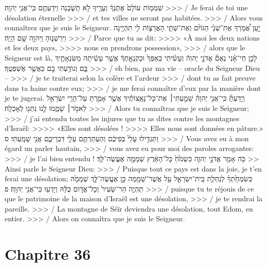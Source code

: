 \begin{paracol}[1]
  {שִֽׁמְמ֤וֹת עוֹלָם֙ אֶתֶּנְךָ֔
    וְעָרֶ֖יךָ לֹ֣א תָשֹׁ֑בְנָה
    וִֽידַעְתֶּ֖ם כִּֽי־אֲנִ֥י יְהוָֽה׃}
  {>>> / Je ferai de toi une désolation éternelle
    >>> / et tes villes ne seront pas habitées.
    >>> / Alors vous connaîtrez que je suis le Seigneur.}
  \verseSpace
  \verset
  {יַ֣עַן אֲ֠מָרְךָ
    אֶת־שְׁנֵ֙י הַגּוֹיִ֜ם וְאֶת־שְׁתֵּ֧י הָאֲרָצ֛וֹת לִ֥י תִהְיֶ֖ינָה
    וִֽירַשְׁנ֑וּהָ
    וַֽיהוָ֖ה שָׁ֥ם הָיָֽה׃}
  {>>> / Parce que tu as dit:
    >>>> «À moi les deux nations et les deux pays,
    >>>> nous en prendrons possession»,
    >>> / alors que le Seigneur est là,}
  \verset
  {לָכֵ֣ן חַי־אָ֗נִי נְאֻם֘ אֲדֹנָ֣י יְהוִה֒
    וְעָשִׂ֗יתִי כְּאַפְּךָ֙ וּכְקִנְאָ֣תְךָ֔
    אֲשֶׁ֣ר עָשִׂ֔יתָה מִשִּׂנְאָתֶ֖יךָ בָּ֑ם
    וְנוֹדַ֥עְתִּי בָ֖ם כַּאֲשֶׁ֥ר אֶשְׁפְּטֶֽךָ׃}
  {>>> / eh bien, par ma vie – oracle du Seigneur Dieu –
    >>> / je te traiterai selon la colère et l’ardeur
    >>> / dont tu as fait preuve dans ta haine contre eux;
    >>> / je me ferai connaître d’eux par la manière dont je te jugerai.}
  \verset
  {וְֽיָדַעְתָּ֘ כִּֽי־אֲנִ֣י יְהוָה֒
    שָׁמַ֣עְתִּי׀ אֶת־כָּל־נָאָֽצוֹתֶ֗יךָ אֲשֶׁ֥ר אָמַ֛רְתָּ עַל־הָרֵ֥י יִשְׂרָאֵ֖ל לֵאמֹ֣ר׀
    שָׁמֵ֑מוּ
    לָ֥נוּ נִתְּנ֖וּ לְאָכְלָֽה׃}
  {>>> / Alors tu connaîtras que je suis le Seigneur;
    >>> / j’ai entendu toutes les injures que tu as dites contre les montagnes d’Israël:
    >>>> «Elles sont désolées !
    >>>> Elles nous sont données en pâture.»}
  \verset
  {וַתַּגְדִּ֤ילוּ עָלַי֙ בְּפִיכֶ֔ם
    וְהַעְתַּרְתֶּ֥ם עָלַ֖י דִּבְרֵיכֶ֑ם
    אֲנִ֖י שָׁמָֽעְתִּי׃ ס}
  {>>> / Vous avez eu à mon égard un parler hautain,
    >>> / vous avez eu pour moi des paroles arrogantes:
    >>> / je l’ai bien entendu !}
  \parSpace
  \verset
  {כֹּ֥ה אָמַ֖ר אֲדֹנָ֣י יְהוִ֑ה
    כִּשְׂמֹ֙חַ֙ כָּל־הָאָ֔רֶץ שְׁמָמָ֖ה אֶעֱשֶׂה־לָּֽךְ׃}
  {>> Ainsi parle le Seigneur Dieu:
    >>> / Puisque tout ce pays est dans la joie, je t’en ferai une désolation;}
  \verset
  {כְּשִׂמְחָ֙תְךָ֜ לְנַחְלַ֧ת בֵּֽית־יִשְׂרָאֵ֛ל עַ֥ל אֲשֶׁר־שָׁמֵ֖מָה
    כֵּ֣ן אֶעֱשֶׂה־לָּ֑ךְ
    שְׁמָמָ֙ה תִֽהְיֶ֤ה הַר־שֵׂעִיר֙ וְכָל־אֱד֣וֹם כֻּלָּ֔הּ
    וְיָדְע֖וּ כִּֽי־אֲנִ֥י יְהוָֽה׃ פ}
  {>>> / puisque tu te réjouis de ce que le patrimoine de la maison d’Israël est une désolation,
    >>> / je te rendrai la pareille.
    >>> / La montagne de Séïr deviendra une désolation, tout Edom, en entier.
    >>> / Alors on connaîtra que je suis le Seigneur.}

  \section*{Chapitre 36}

\end{paracol}
